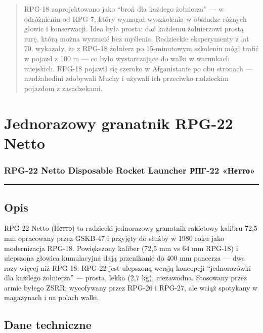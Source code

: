 \documentclass[12pt,openany,oneside]{book}
\begin{document}
\begin{quote}
RPG-18 zaprojektowano jako ``broń dla każdego żołnierza'' --- w
odróżnieniu od RPG-7, który wymagał wyszkolenia w obsłudze różnych
głowic i konserwacji. Idea była prosta: dać każdemu żołnierzowi prostą
rurę, którą można wyrzucić bez myślenia. Radzieckie eksperymenty z lat
70. wykazały, że z RPG-18 żołnierz po 15-minutowym szkoleniu mógł trafić
w pojazd z 100 m --- co było wystarczające do walki w warunkach
miejskich. RPG-18 pojawił się szeroko w Afganistanie po obu stronach ---
mudżahedini zdobywali Muchy i używali ich przeciwko radzieckim pojazdom
z zasadzekami.
\end{quote}

\chapter{Jednorazowy granatnik RPG-22
Netto}\label{jednorazowy-granatnik-rpg-22-netto}

\subsection{RPG-22 Netto Disposable Rocket Launcher \textbar{} РПГ-22
«Нетто»}\label{rpg-22-netto-disposable-rocket-launcher-ux440ux43fux433-22-ux43dux435ux442ux442ux43e}

\begin{center}\rule{0.5\linewidth}{0.5pt}\end{center}

\section{Opis}\label{opis-70}

RPG-22 Netto (Нетто) to radziecki jednorazowy granatnik rakietowy
kalibru 72,5 mm opracowany przez GSKB-47 i przyjęty do służby w 1980
roku jako modernizacja RPG-18. Powiększony kaliber (72,5 mm vs 64 mm
RPG-18) i ulepszona głowica kumulacyjna dają przenikanie do 400 mm
pancerza --- dwa razy więcej niż RPG-18. RPG-22 jest ulepszoną wersją
koncepcji ``jednorazówki dla każdego żołnierza'' --- prosta, lekka (2,7
kg), niezawodna. Stosowany przez armie byłego ZSRR; wycofywany przez
RPG-26 i RPG-27, ale wciąż spotykany w magazynach i na polach walki.

\section{Dane techniczne}\label{dane-techniczne-70}
\end{document}
